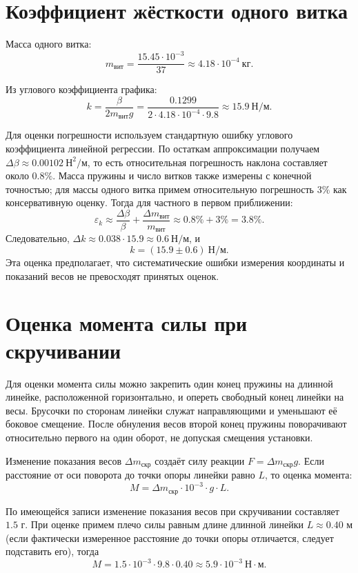 \documentclass[12pt]{article}
\begin{document}
    \section{Коэффициент жёсткости одного витка}

    Масса одного витка:
    \[
        m_{\text{вит}} = \frac{15.45 \cdot 10^{-3}}{37}
        \approx 4.18 \cdot 10^{-4} \ \text{кг}.
    \]

    Из углового коэффициента графика:
    \[
        k = \frac{\beta}{2 m_{\text{вит}} g}
        = \frac{0.1299}{2 \cdot 4.18 \cdot 10^{-4} \cdot 9.8}
        \approx 15.9 \ \text{Н/м}.
    \]

    Для оценки погрешности используем стандартную ошибку углового коэффициента линейной регрессии. По остаткам аппроксимации получаем $\Delta\beta \approx 0.00102~\text{Н}^2/\text{м}$, то есть относительная погрешность наклона составляет около $0.8\%$. Масса пружины и число витков также измерены с конечной точностью; для массы одного витка примем относительную погрешность $3\%$ как консервативную оценку. Тогда для частного в первом приближении:
    \[
        \varepsilon_k \approx \frac{\Delta\beta}{\beta}+
        \frac{\Delta m_{\text{вит}}}{m_{\text{вит}}}
        \approx 0.8\%+3\%=3.8\%.
    \]
    Следовательно, $\Delta k \approx 0.038\cdot15.9\approx0.6~\text{Н/м}$, и
    \[
        k=(15.9\pm0.6)~\text{Н/м}.
    \]
    Эта оценка предполагает, что систематические ошибки измерения координаты и показаний весов не превосходят принятых оценок.

    \section{Оценка момента силы при скручивании}

    Для оценки момента силы можно закрепить один конец пружины на длинной линейке, расположенной горизонтально, и опереть свободный конец линейки на весы. Брусочки по сторонам линейки служат направляющими и уменьшают её боковое смещение. После обнуления весов второй конец пружины поворачивают относительно первого на один оборот, не допуская смещения установки.

    Изменение показания весов $\Delta m_{\text{скр}}$ создаёт силу реакции $F = \Delta m_{\text{скр}} g$. Если расстояние от оси поворота до точки опоры линейки равно $L$, то оценка момента:
    \[
        M = \Delta m_{\text{скр}} \cdot 10^{-3} \cdot g \cdot L.
    \]

    По имеющейся записи изменение показания весов при скручивании составляет $1.5$ г. При оценке примем плечо силы равным длине длинной линейки $L \approx 0.40$ м (если фактически измеренное расстояние до точки опоры отличается, следует подставить его), тогда
    \[
        M = 1.5 \cdot 10^{-3} \cdot 9.8 \cdot 0.40
        \approx 5.9 \cdot 10^{-3} \ \text{Н} \cdot \text{м}.
    \]
\end{document}
